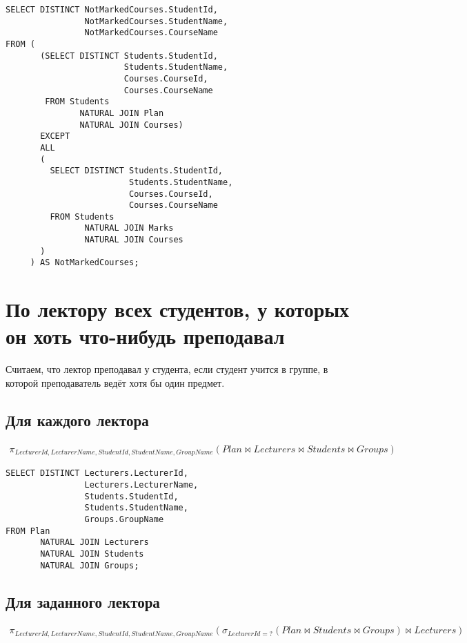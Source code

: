 \documentclass{article}
\begin{document}
\begin{verbatim}
SELECT DISTINCT NotMarkedCourses.StudentId,
                NotMarkedCourses.StudentName,
                NotMarkedCourses.CourseName
FROM (
       (SELECT DISTINCT Students.StudentId,
                        Students.StudentName,
                        Courses.CourseId,
                        Courses.CourseName
        FROM Students
               NATURAL JOIN Plan
               NATURAL JOIN Courses)
       EXCEPT
       ALL
       (
         SELECT DISTINCT Students.StudentId,
                         Students.StudentName,
                         Courses.CourseId,
                         Courses.CourseName
         FROM Students
                NATURAL JOIN Marks
                NATURAL JOIN Courses
       )
     ) AS NotMarkedCourses;
\end{verbatim}

	\section{По лектору всех студентов, у которых он хоть что-нибудь преподавал}
	
	Считаем, что лектор преподавал у студента, если студент учится в группе, в которой преподаватель ведёт хотя бы один предмет.
	
	\subsection{Для каждого лектора}
	
	\begin{align*}
	\pi_{LecturerId, LecturerName, StudentId, StudentName, GroupName}(Plan \bowtie Lecturers \bowtie Students \bowtie Groups)
	\end{align*}
	
\begin{verbatim}
SELECT DISTINCT Lecturers.LecturerId,
                Lecturers.LecturerName,
                Students.StudentId,
                Students.StudentName,
                Groups.GroupName
FROM Plan
       NATURAL JOIN Lecturers
       NATURAL JOIN Students
       NATURAL JOIN Groups;
\end{verbatim}

	\subsection{Для заданного лектора}
	
	\begin{align*}
	\pi_{LecturerId, LecturerName, StudentId, StudentName, GroupName}(\sigma_{LecturerId = ?}(Plan \bowtie Students \bowtie Groups) \bowtie Lecturers)
	\end{align*}
	
\end{document}
